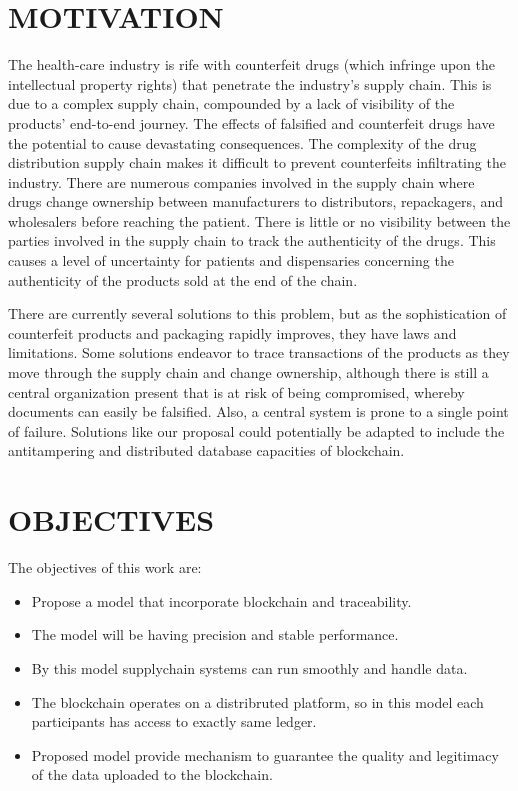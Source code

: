 \documentclass[12pt,a4paper]{report}
\begin{document}
\section{MOTIVATION}
\hspace*{1cm}The health-care industry is rife with counterfeit drugs (which infringe upon
the intellectual property rights) that penetrate the industry’s supply chain. This is due to a complex supply chain, compounded by a lack of visibility of the products’ end-to-end journey. The effects of falsified and counterfeit drugs have the potential to cause devastating consequences. The complexity of the drug distribution supply chain makes it difficult to prevent counterfeits infiltrating the industry. There are numerous companies involved in the supply chain where drugs change ownership between manufacturers to distributors, repackagers, and wholesalers before reaching the patient. There is little or no visibility between the parties involved in the supply chain to track the authenticity of the drugs. This causes a level of uncertainty for patients and dispensaries concerning the authenticity of the products sold at the end of the chain.
\par
\hspace*{1cm}There are currently several solutions to this problem, but as the sophistication of counterfeit products and packaging rapidly improves, they have laws and limitations. Some solutions endeavor to trace transactions of the products as they move through the supply chain and change ownership, although there is still a central organization present that is at risk of being compromised, whereby documents can easily be falsified. Also, a central system is prone to a single point of failure. Solutions like our proposal could potentially be adapted to include the antitampering and distributed database capacities of blockchain.
\vspace{1 cm}
\section{OBJECTIVES}
The objectives of this work are:
\begin{itemize}
    \item Propose a model that incorporate blockchain and traceability.
    \item The model will be having precision and stable performance.
    \item By this model supplychain systems can run smoothly and handle data.
    \item The blockchain operates on a distribruted platform, so in this model each participants has access to exactly same ledger.
   \item Proposed model provide mechanism to guarantee the quality and legitimacy of the data uploaded to the blockchain.
\end{itemize}
\end{document}
